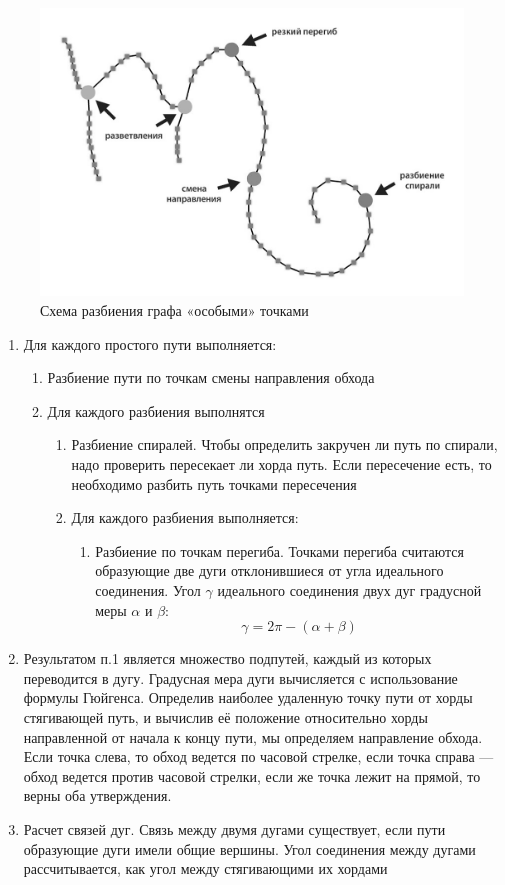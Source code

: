 \begin{figure}[h]
\includegraphics[width=\linewidth,keepaspectratio]{images/th_peregib}
\caption{Схема разбиения графа «особыми» точками}
\end{figure}

\begin{enumerate}
\item Для каждого простого пути выполняется:
	\begin{enumerate}
		\item Разбиение пути по точкам смены направления обхода
		\item Для каждого разбиения выполнятся
		\begin{enumerate}
			\item Разбиение спиралей. Чтобы определить закручен ли путь по спирали, надо проверить пересекает ли хорда путь. Если пересечение есть, то необходимо разбить путь точками пересечения
			\item Для каждого разбиения выполняется:
			\begin{enumerate}
				\item Разбиение по точкам перегиба. Точками перегиба считаются образующие две дуги отклонившиеся от угла идеального соединения. Угол $\gamma$ идеального соединения двух дуг градусной меры $\alpha$ и $\beta$: $$\gamma=2\pi-(\alpha+\beta)$$
			\end{enumerate}
		\end{enumerate}		
	\end{enumerate}	
\item Результатом п.1 является множество подпутей, каждый из которых переводится в дугу. Градусная мера дуги вычисляется с использование формулы Гюйгенса. Определив наиболее удаленную точку пути от хорды стягивающей путь, и вычислив её положение относительно хорды направленной от начала к концу пути, мы определяем направление обхода. Если точка слева, то обход ведется по часовой стрелке, если точка справа — обход ведется против часовой стрелки, если же точка лежит на прямой, то верны оба утверждения.
\item Расчет связей дуг. Связь между двумя дугами существует, если пути образующие дуги имели общие вершины. Угол соединения между дугами рассчитывается, как угол между стягивающими их хордами
\end{enumerate}


